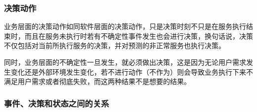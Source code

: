 \subsubsection{决策动作}

业务层面的决策动作如同软件层面的决策动作，只是决策时刻不只是在服务执行结束时，而且在服务未执行时若有不确定性事件发生也会进行决策，换句话说，决策不仅包括对当前所执行服务的决策，并对预测的非正常服务也执行决策。

同时，业务层面的不确定性一旦发生，就必须做出决策，这是因为无论用户需求发生变化还是外部环境发生变化，若不进行动作（不作为）则会导致业务执行下来不满足用户需求或者彻底失败，而这两种结果不是想要的结果。

\subsubsection{事件、决策和状态之间的关系}

